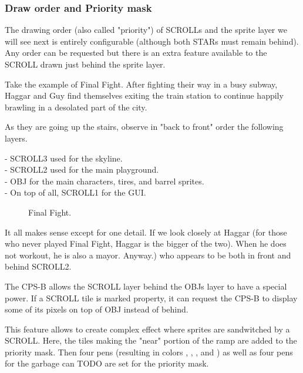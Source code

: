 \subsubsection{Draw order and Priority mask}\label{finalfight_trick}


The drawing order (also called "priority") of SCROLLs and the sprite layer we will see next is entirely configurable (although both STARs must remain behind). Any order can be requested but there is an extra feature available to the SCROLL drawn just behind the sprite layer.

Take the example of Final Fight. After fighting their way in a busy subway, Haggar and Guy find themselves exiting the train station to continue happily brawling in a desolated part of the city. 

As they are going up the stairs, observe in "back to front" order the following layers.

-  SCROLL3 used for the skyline.\\
-  SCROLL2 used for the main playground.\\
-  OBJ for the main characters, tires, and barrel sprites.\\
-  On top of all, SCROLL1 for the GUI.


\vfill
\begin{figure}[!b]
 \caption*{Final Fight.}%
 \end{figure}%
\pagebreak


It all makes sense except for one detail. If we look closely at Haggar (for those who never played Final Fight, Haggar is the bigger of the two). When he does not workout, he is also a mayor. Anyway.) who appears to be both in front and behind SCROLL2.

The CPS-B allows the SCROLL layer behind the OBJs layer to have a special power. If a SCROLL tile is marked property, it can request the CPS-B to display some of its pixels on top of OBJ instead of behind.

This feature allows to create complex effect where sprites are sandwitched by a SCROLL. Here, the tiles making the "near" portion of the ramp are added to the priority mask. Then four pens (resulting in colors  ,  ,  , and ) as well as four pens for the garbage can TODO are set for the priority mask.

